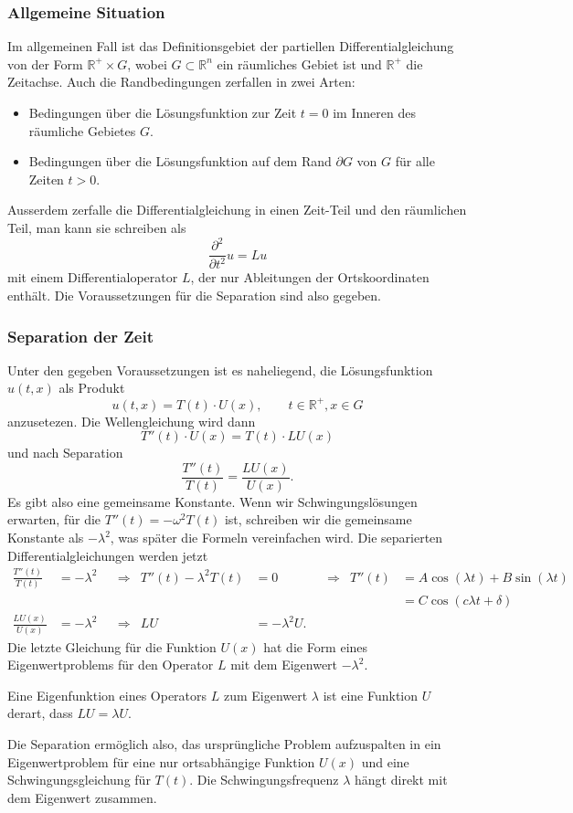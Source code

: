%
%
\subsubsection{Allgemeine Situation}
Im allgemeinen Fall ist das Definitionsgebiet der partiellen
Differentialgleichung von der Form $\mathbb{R}^+\times G$,
wobei $G\subset\mathbb{R}^n$
ein räumliches Gebiet ist und $\mathbb{R}^+$ die Zeitachse.
Auch die Randbedingungen zerfallen in zwei Arten:
\begin{itemize}
\item
Bedingungen über die Lösungsfunktion zur Zeit $t=0$ im Inneren des
räumliche Gebietes $G$.
\item
Bedingungen über die Lösungsfunktion auf dem Rand $\partial G$ von
$G$ für alle Zeiten $t>0$.
\end{itemize}
Ausserdem zerfalle die Differentialgleichung in einen Zeit-Teil und den
räumlichen Teil, man kann sie schreiben als
\[
\frac{\partial^2}{\partial t^2} u
=
Lu
\]
mit einem Differentialoperator $L$, der nur Ableitungen der
Ortskoordinaten enthält.
Die Voraussetzungen für die Separation sind also gegeben.

%
%
\subsubsection{Separation der Zeit}
Unter den gegeben Voraussetzungen ist es naheliegend, die Lösungsfunktion
$u(t,x)$ als Produkt
\[
u(t,x) = T(t) \cdot U(x),\qquad t\in\mathbb{R}^+, x\in G
\]
anzusetezen.
Die Wellengleichung wird dann
\[
T''(t)\cdot U(x)
=
T(t)\cdot L U(x)
\]
und nach Separation
\[
\frac{T''(t)}{T(t)}
=
\frac{L U(x)}{U(x)}.
\]
Es gibt also eine gemeinsame Konstante.
Wenn wir Schwingungslösungen erwarten, für die $T''(t) = -\omega^2 T(t)$
ist, schreiben wir die gemeinsame Konstante als $-\lambda^2$, was
später die Formeln vereinfachen wird.
Die separierten Differentialgleichungen werden jetzt
\begin{align*}
\frac{T''(t)}{T(t)}
&=
-\lambda^2
&&\Rightarrow&
T''(t)-\lambda^2 T(t)&=0
&&\Rightarrow&
T''(t) &= A \cos(\lambda t) + B \sin( \lambda t)
\\
&&&&&&&&
       &= C \cos(c \lambda t+\delta)
\\
\frac{L U(x)}{U(x)}&=-\lambda^2
&&\Rightarrow&
L U &= -\lambda^2 U.
\end{align*}
Die letzte Gleichung für die Funktion $U(x)$ hat die Form
eines Eigenwertproblems für den Operator $L$ mit dem
Eigenwert $-\lambda^2$.

\begin{definition}
Eine Eigenfunktion eines Operators $L$ zum Eigenwert $\lambda$
ist eine Funktion $U$ derart, dass $LU=\lambda U$.
\end{definition}

Die Separation ermöglich also, das ursprüngliche Problem aufzuspalten
in ein Eigenwertproblem für eine nur ortsabhängige Funktion $U(x)$
und eine Schwingungsgleichung für $T(t)$.
Die Schwingungsfrequenz $\lambda $ hängt direkt mit dem
Eigenwert zusammen.


